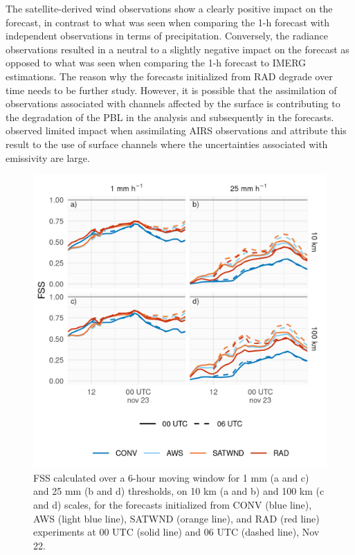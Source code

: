 \documentclass[final,5p,times,twocolumn,authoryear]{elsarticle} %
\begin{document}
The satellite-derived wind observations show a clearly positive impact on the forecast, in contrast to what was seen when comparing the 1-h forecast with independent observations in terms of precipitation. Conversely, the radiance observations resulted in a neutral to a slightly negative impact on the forecast as opposed to what was seen when comparing the 1-h forecast to IMERG estimations. The reason why the forecasts initialized from RAD degrade over time needs to be further study. However, it is possible that the assimilation of observations associated with channels affected by the surface is contributing to the degradation of the PBL in the analysis and subsequently in the forecasts. \citet{lim2014} observed limited impact when assimilating AIRS observations and attribute this result to the use of surface channels where the uncertainties associated with emissivity are large.



\begin{figure}
\centering
\includegraphics{../figures/fssfcst-1.png}
\caption{\label{fig:fssfcst}FSS calculated over a 6-hour moving window for 1 mm (a and c) and 25 mm (b and d) thresholds, on 10 km (a and b) and 100 km (c and d) scales, for the forecasts initialized from CONV (blue line), AWS (light blue line), SATWND (orange line), and RAD (red line) experiments at 00 UTC (solid line) and 06 UTC (dashed line), Nov 22.}
\end{figure}
\end{document}
